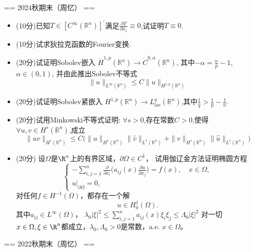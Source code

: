 == 2024秋期末（周忆） ==
\begin{itemize}
     \item[一] (10分)已知$T\in [C^{\infty}(\mathbb{R}^n)]^{\prime}$满足$\frac{\partial T}{\partial x_{1}}\equiv 0$,试证明$T\equiv 0$.
     \item[二] (10分)试求狄拉克函数的Fourier变换.
     \item[三] (20分)试证明Sobolev嵌入 $\dot{H}^{1,p}(\mathbb{R}^n)\rightarrow \dot{C}^{0,\alpha}(\mathbb{R}^n)$, 
     其中$-\alpha = \frac{n}{p}-1$, $\alpha\in(0,1)$, 并由此推出Sobolev不等式
     \[\|u\|_{L^{\infty}(\mathbb{R}^n)}\leq C \|u\|_{H^{1,p}(\mathbb{R}^n)}\]
     \item[四] (20分)试证明Sobolev紧嵌入 $H^{1,p}(\mathbb{R}^{n})\rightarrow L^{q}_{loc}(\mathbb{R}^n)$,其中$\frac{1}{q}>\frac{1}{p}-\frac{1}{n}$.
     \item[五] (20分)试用Minkowski不等式证明: $\forall s>0$,存在常数$C>0$,使得$\forall u,v\in H^{s}(\mathbb{R}^n)$,成立
     \[\|uv\|_{H^{s}(\mathbb{R}^n)}\leq C \big(\|u\|_{H^{s}(\mathbb{R}^n)}\|\hat{v}\|_{L^1(\mathbb{R}^n)}+\|v\|_{H^{s}(\mathbb{R}^n)}\|\hat{u}\|_{L^1(\mathbb{R}^n)}\big)\]
     \item[六] (20分) 设$\Omega$是$\R^n$上的有界区域，$\partial\Omega\in C^1$，
    试用伽辽金方法证明椭圆方程
    \[\begin{cases}
        \displaystyle-\sum_{i,j=1}^n\frac{\partial}{\partial x_i}
        \bigg(a_{ij}(x)\frac{\partial u}{\partial x_j}\bigg)
        =f(x),\quad x\in\Omega,\\
        u|_{\partial\Omega}=0,
    \end{cases}\]
    对任何$f\in H^{-1}(\Omega)$，都存在一个解
    \[u\in H_0^1(\Omega).\]
    其中$a_{ij}\in L^\infty(\Omega)$，
    $\lambda_0|\xi|^2\leq\sum\limits_{i,j=1}^na_{ij}(x)\xi_i\xi_j\leq\Lambda_0|\xi|^2$
    对一切$x\in\Omega,\xi\in\R^n$都成立，$\lambda_0,\Lambda_0>0$是常数，$\text{a.e. }x\in\Omega$。
\end{itemize}

== 2022秋期末（周忆） ==


